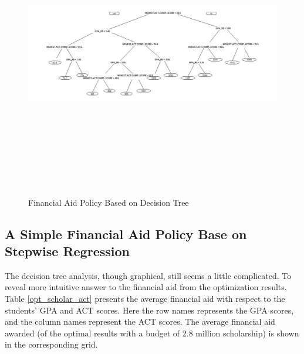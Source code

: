 \documentclass[12pt,english]{report}
\begin{document}
 
 \begin{figure}
  \centering
  \includegraphics[width=8in, height=5in, angle=90, origin=c]{FAPolicyDT.jpg}
 \caption{Financial Aid Policy Based on Decision Tree }
 \label{FApolicybyDT}
 \end{figure}

% 

\subsection{A Simple Financial Aid Policy Base on Stepwise Regression}
The decision tree analysis, though graphical, still seems a little complicated.  To reveal more intuitive answer to the financial aid from the optimization results, Table \ref{opt_scholar_act} presents the average financial aid with respect to the students' GPA and ACT scores. Here the row names represents the GPA scores, and the column names represent the ACT scores. The average financial aid awarded (of the optimal results with a budget of 2.8 million scholarship) is shown in the corresponding grid.  
\end{document}

